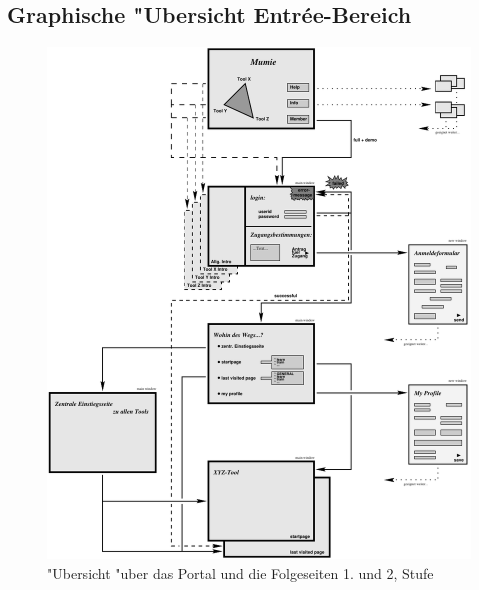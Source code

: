 \clearpage


\subsection{Graphische "Ubersicht Entr\'{e}e-Bereich}


\begin{figure}[h!]
\begin{center}
\ifx\pdfoutput\undefined
\else
  \includegraphics{Skizzen/overview_portal.pdf}
\fi
\caption{"Ubersicht "uber das Portal und die  Folgeseiten 1. und 2, Stufe}
\end{center}
\end{figure}
 













